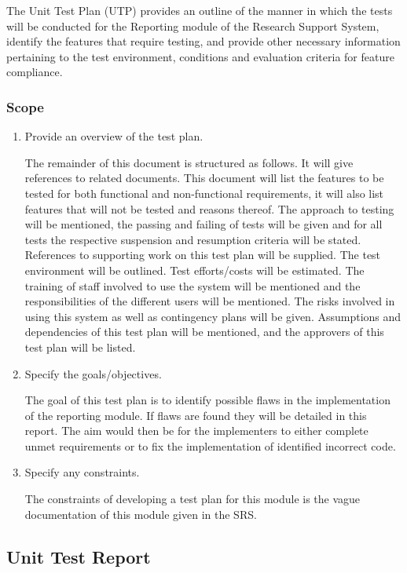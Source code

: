 The Unit Test Plan (UTP) provides an outline of the manner in which the tests will be conducted for the Reporting module of the Research Support System, identify the features that require testing, and provide other necessary information pertaining to the test environment, conditions and evaluation criteria for feature compliance.
 
\subsubsection{Scope}
\begin{enumerate}
	\item Provide an overview of the test plan.
		
The remainder of this document is structured as follows. It will give references to related documents. This document will   list the features to be tested for both functional and non-functional requirements, it will also list features that will not be tested and reasons thereof. The approach to testing will be mentioned, the passing and failing of tests will be given and for all tests the respective suspension and resumption criteria will be stated. References to supporting work on this test plan will be supplied. The test environment will be outlined. Test efforts/costs will be estimated. The training of staff involved to use the system will be mentioned and the responsibilities of the different users will be mentioned. The risks involved in using this system as well as contingency plans will be given. Assumptions and dependencies of this test plan will be mentioned, and the approvers of this test plan will be listed.

	\item Specify the goals/objectives.

The goal of this test plan is to identify possible flaws in the implementation of the reporting module. If flaws are found they will be detailed in this report. The aim would then be for the implementers to either complete unmet requirements or to fix the implementation of identified incorrect code.

	\item Specify any constraints.

The constraints of developing a test plan for this module is the vague documentation of this module given in the SRS. 
\end{enumerate} 

\subsection{Unit Test Report}

